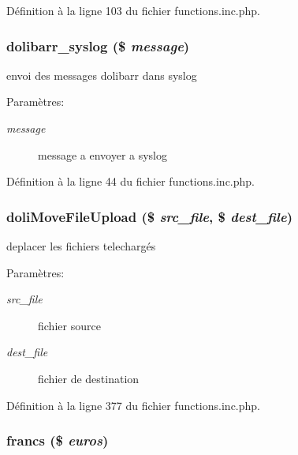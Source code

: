D\'{e}finition \`{a} la ligne 103 du fichier functions.inc.php.\hypertarget{functions_8inc_8php_a1}{
\subsubsection[dolibarr\_\-syslog]{\setlength{\rightskip}{0pt plus 5cm}dolibarr\_\-syslog (\$ {\em message})}}
\label{functions_8inc_8php_a1}


envoi des messages dolibarr dans syslog 

\begin{Desc}
\item[Param\`{e}tres:]
\begin{description}
\item[{\em message}]message a envoyer a syslog \end{description}
\end{Desc}


D\'{e}finition \`{a} la ligne 44 du fichier functions.inc.php.\hypertarget{functions_8inc_8php_a23}{
\subsubsection[doliMoveFileUpload]{\setlength{\rightskip}{0pt plus 5cm}doli\-Move\-File\-Upload (\$ {\em src\_\-file}, \$ {\em dest\_\-file})}}
\label{functions_8inc_8php_a23}


deplacer les fichiers telecharg\'{e}s 

\begin{Desc}
\item[Param\`{e}tres:]
\begin{description}
\item[{\em src\_\-file}]fichier source \item[{\em dest\_\-file}]fichier de destination \end{description}
\end{Desc}


D\'{e}finition \`{a} la ligne 377 du fichier functions.inc.php.\hypertarget{functions_8inc_8php_a39}{
\subsubsection[francs]{\setlength{\rightskip}{0pt plus 5cm}francs (\$ {\em euros})}}
\label{functions_8inc_8php_a39}



